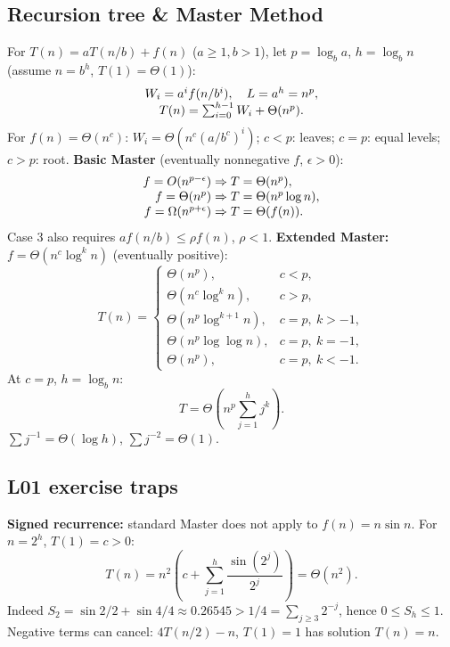 \subsection{Recursion tree \& Master Method}
For $T(n)=aT(n/b)+f(n)$ ($a\ge1,b>1$), let $p=\log_b a$, $h=\log_b n$ (assume $n=b^h$, $T(1)=\Theta(1)$):
\[
\begin{array}{@{}c@{}}
W_i=a^if(n/b^i),\quad L=a^h=n^p,\\
T(n)=\sum_{i=0}^{h-1}W_i+\Theta(n^p).
\end{array}
\]
For $f(n)=\Theta(n^c)$: $W_i=\Theta\!\left(n^c(a/b^c)^i\right)$;
$c<p$: leaves; $c=p$: equal levels; $c>p$: root.
\textbf{Basic Master} (eventually nonnegative $f$, $\epsilon>0$):
\[
\begin{array}{@{}r@{\;}l@{}}
f=O(n^{p-\epsilon})&\Rightarrow T=\Theta(n^p),\\
f=\Theta(n^p)&\Rightarrow T=\Theta(n^p\log n),\\
f=\Omega(n^{p+\epsilon})&\Rightarrow T=\Theta(f(n)).
\end{array}
\]
Case 3 also requires $af(n/b)\le\rho f(n)$, $\rho<1$.
\textbf{Extended Master:} $f=\Theta(n^c\log^k n)$ (eventually positive):
\[
T(n)=\begin{cases}
\Theta(n^p),&c<p,\\
\Theta(n^c\log^k n),&c>p,\\
\Theta(n^p\log^{k+1}n),&c=p,\ k>-1,\\
\Theta(n^p\log\log n),&c=p,\ k=-1,\\
\Theta(n^p),&c=p,\ k<-1.
\end{cases}
\]
At $c=p$, $h=\log_b n$:
\[
\textstyle T=\Theta\!\left(n^p\sum_{j=1}^{h}j^k\right).
\]
$\sum j^{-1}=\Theta(\log h)$, $\sum j^{-2}=\Theta(1)$.

\subsection{L01 exercise traps}
\textbf{Signed recurrence:} standard Master does not apply to $f(n)=n\sin n$.
For $n=2^h$, $T(1)=c>0$:
\[
\textstyle T(n)=n^2\left(c+\sum_{j=1}^h\frac{\sin(2^j)}{2^j}\right)=\Theta(n^2).
\]
Indeed $S_2=\sin2/2+\sin4/4\approx0.26545>1/4=\sum_{j\ge3}2^{-j}$, hence $0\le S_h\le1$.
Negative terms can cancel: $4T(n/2)-n$, $T(1)=1$ has solution $T(n)=n$.
